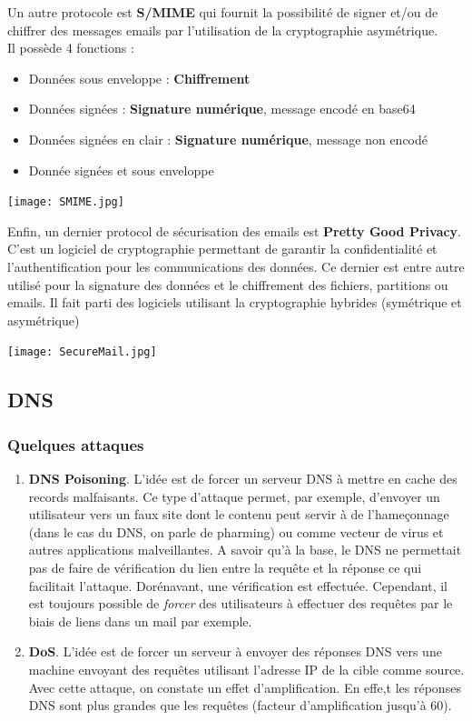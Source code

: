 \documentclass{report}
\begin{document}
Un autre protocole est \textbf{S/MIME} qui fournit la possibilité de signer et/ou de chiffrer des messages emails par l'utilisation de la cryptographie asymétrique.\\
Il possède 4 fonctions :
\begin{itemize}
    \item Données sous enveloppe : \textbf{Chiffrement}
    \item Données signées : \textbf{Signature numérique}, message encodé en base64
    \item Données signées en clair : \textbf{Signature numérique}, message non encodé
    \item Donnée signées et sous enveloppe
\end{itemize}

 \texttt{[image: SMIME.jpg]}

 Enfin, un dernier protocol de sécurisation des emails est \textbf{Pretty Good Privacy}. C'est un logiciel de cryptographie permettant de garantir la confidentialité et l'authentification pour les communications des données. Ce dernier est entre autre utilisé pour la signature des données et le chiffrement des fichiers, partitions ou emails. Il fait parti des logiciels utilisant la cryptographie hybrides (symétrique et asymétrique)

 \texttt{[image: SecureMail.jpg]}


\subsection{DNS}

\subsubsection{Quelques attaques}

\begin{enumerate}
    \item \textbf{DNS Poisoning}. L'idée est de forcer un serveur DNS à mettre en cache des records malfaisants. Ce type d'attaque permet, par exemple, d'envoyer un utilisateur vers un faux site dont le contenu peut servir à de l'hameçonnage (dans le cas du DNS, on parle de pharming) ou comme vecteur de virus et autres applications malveillantes. A savoir qu'à la base, le DNS ne permettait pas de faire de vérification du lien entre la requête et la réponse ce qui facilitait l'attaque. Dorénavant, une vérification est effectuée. Cependant, il est toujours possible de \textit{forcer} des utilisateurs à effectuer des requêtes par le biais de liens dans un mail par exemple.

    \item \textbf{DoS}. L'idée est de forcer un serveur à envoyer des réponses DNS vers une machine envoyant des requêtes utilisant l'adresse IP de la cible comme source. Avec cette attaque, on constate un effet d'amplification. En effe,t les réponses DNS sont plus grandes que les requêtes (facteur d'amplification jusqu'à 60).
\end{enumerate}
\end{document}
